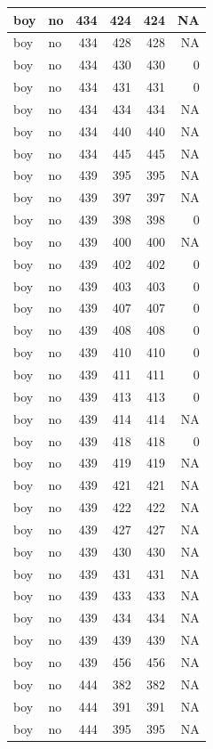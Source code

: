 \documentclass[man]{apa6}
\begin{document}
\begin{tabular}{l|l|r|r|r|r}
\hline
boy & no & 434 & 424 & 424 & NA\\
\hline
boy & no & 434 & 428 & 428 & NA\\
\hline
boy & no & 434 & 430 & 430 & 0\\
\hline
boy & no & 434 & 431 & 431 & 0\\
\hline
boy & no & 434 & 434 & 434 & NA\\
\hline
boy & no & 434 & 440 & 440 & NA\\
\hline
boy & no & 434 & 445 & 445 & NA\\
\hline
boy & no & 439 & 395 & 395 & NA\\
\hline
boy & no & 439 & 397 & 397 & NA\\
\hline
boy & no & 439 & 398 & 398 & 0\\
\hline
boy & no & 439 & 400 & 400 & NA\\
\hline
boy & no & 439 & 402 & 402 & 0\\
\hline
boy & no & 439 & 403 & 403 & 0\\
\hline
boy & no & 439 & 407 & 407 & 0\\
\hline
boy & no & 439 & 408 & 408 & 0\\
\hline
boy & no & 439 & 410 & 410 & 0\\
\hline
boy & no & 439 & 411 & 411 & 0\\
\hline
boy & no & 439 & 413 & 413 & 0\\
\hline
boy & no & 439 & 414 & 414 & NA\\
\hline
boy & no & 439 & 418 & 418 & 0\\
\hline
boy & no & 439 & 419 & 419 & NA\\
\hline
boy & no & 439 & 421 & 421 & NA\\
\hline
boy & no & 439 & 422 & 422 & NA\\
\hline
boy & no & 439 & 427 & 427 & NA\\
\hline
boy & no & 439 & 430 & 430 & NA\\
\hline
boy & no & 439 & 431 & 431 & NA\\
\hline
boy & no & 439 & 433 & 433 & NA\\
\hline
boy & no & 439 & 434 & 434 & NA\\
\hline
boy & no & 439 & 439 & 439 & NA\\
\hline
boy & no & 439 & 456 & 456 & NA\\
\hline
boy & no & 444 & 382 & 382 & NA\\
\hline
boy & no & 444 & 391 & 391 & NA\\
\hline
boy & no & 444 & 395 & 395 & NA\\

\end{tabular}
\end{document}
